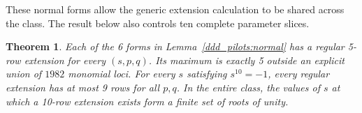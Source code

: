 \documentclass[11pt,a4paper]{article}
\newtheorem{theorem}{Theorem}[section]
\theoremstyle{plain}
\theoremstyle{definition}
\theoremstyle{plain}
\begin{document}
These normal forms allow the generic extension calculation to be shared across the class. The result below also controls ten complete parameter slices.

\par\addvspace{\medskipamount}\noindent
\begin{minipage}{\linewidth}
\begin{theorem}\label{ddd_pilots:3297}
Each of the 6 forms in Lemma~\ref{ddd_pilots:normal} has a regular 5-row extension for every $(s,p,q)$. Its maximum is exactly 5 outside an explicit union of $1982$ monomial loci. For every $s$ satisfying $s^{10}=-1$, every regular extension has at most 9 rows for all $p,q$. In the entire class, the values of $s$ at which a 10-row extension exists form a finite set of roots of unity.
\end{theorem}
\end{minipage}
\par\addvspace{\medskipamount}
\end{document}
